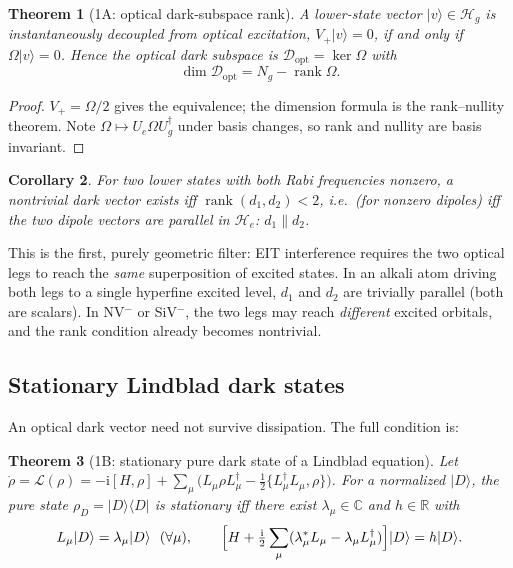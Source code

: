 \documentclass[11pt,a4paper]{article}
\newtheorem{theorem}{Theorem}[section]
\newtheorem{corollary}[theorem]{Corollary}
\theoremstyle{remark}
\newcommand{\Hg}{\mathcal{H}_g}
\newcommand{\He}{\mathcal{H}_e}
\newcommand{\im}{\mathrm{i}}
\newcommand{\rank}{\operatorname{rank}}
\newcommand{\ket}[1]{|#1\rangle}
\newcommand{\bra}[1]{\langle #1|}
\begin{document}
\begin{theorem}[1A: optical dark-subspace rank]
\label{thm:1A}
A lower-state vector $\ket{v}\in\Hg$ is instantaneously decoupled from optical
excitation, $V_+\ket{v}=0$, if and only if $\Omega\ket{v}=0$. Hence the
optical dark subspace is $\mathcal{D}_{\mathrm{opt}}=\ker\Omega$ with
\begin{equation}
\dim\mathcal{D}_{\mathrm{opt}} = N_g-\rank\Omega .
\end{equation}
\end{theorem}

\begin{proof}
$V_+=\Omega/2$ gives the equivalence; the dimension formula is the
rank--nullity theorem. Note $\Omega\mapsto U_e\Omega U_g^\dagger$ under basis
changes, so rank and nullity are basis invariant.
\end{proof}

\begin{corollary}
For two lower states with both Rabi frequencies nonzero, a nontrivial dark
vector exists iff $\rank(d_1,d_2)<2$, i.e.\ (for nonzero dipoles) iff the two
dipole vectors are \emph{parallel} in $\He$: $d_1\parallel d_2$.
\end{corollary}

\begin{physbox}
This is the first, purely geometric filter: EIT interference requires the two
optical legs to reach the \emph{same} superposition of excited states. In an
alkali atom driving both legs to a single hyperfine excited level, $d_1$ and
$d_2$ are trivially parallel (both are scalars). In NV$^-$ or SiV$^-$, the two
legs may reach \emph{different} excited orbitals, and the rank condition
already becomes nontrivial.
\end{physbox}

\subsection{Stationary Lindblad dark states}

An optical dark vector need not survive dissipation. The full condition is:

\begin{theorem}[1B: stationary pure dark state of a Lindblad equation]
\label{thm:1B}
Let $\dot\rho=\mathcal{L}(\rho)=-\im[H,\rho]
+\sum_\mu\bigl(L_\mu\rho L_\mu^\dagger-\tfrac12\{L_\mu^\dagger L_\mu,\rho\}\bigr)$.
For a normalized $\ket{D}$, the pure state $\rho_D=\ket{D}\bra{D}$ is
stationary iff there exist $\lambda_\mu\in\mathbb C$ and $h\in\mathbb R$ with
\begin{equation}
L_\mu\ket{D}=\lambda_\mu\ket{D}\ \ (\forall\mu),
\qquad
\Bigl[H+\tfrac{\im}{2}\sum_\mu(\lambda_\mu^*L_\mu-\lambda_\mu L_\mu^\dagger)\Bigr]
\ket{D}=h\ket{D}.
\end{equation}
\end{theorem}
\end{document}
